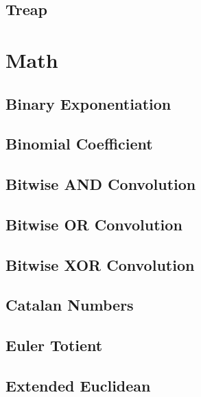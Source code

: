 \subsection{Treap}
\raggedbottom
\hrulefill

\section{Math}
\subsection{Binary Exponentiation}
\raggedbottom
\hrulefill
\subsection{Binomial Coefficient}
\raggedbottom
\hrulefill
\subsection{Bitwise AND Convolution}
\raggedbottom
\hrulefill
\subsection{Bitwise OR Convolution}
\raggedbottom
\hrulefill
\subsection{Bitwise XOR Convolution}
\raggedbottom
\hrulefill
\subsection{Catalan Numbers}
\raggedbottom
\hrulefill
\subsection{Euler Totient}
\raggedbottom
\hrulefill
\subsection{Extended Euclidean}
\raggedbottom
\hrulefill
